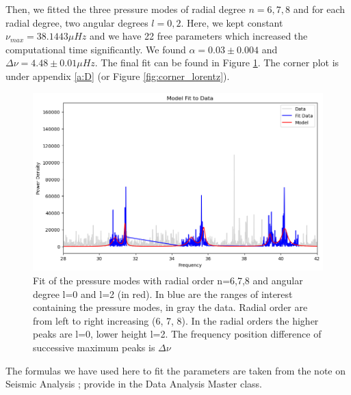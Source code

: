 \documentclass[12pt]{article}
\begin{document}
Then, we fitted the three pressure modes of radial degree $n=6,7,8$ and for each radial degree, two angular degrees $l=0,2$. Here, we kept constant $\nu_{max} = 38.1443\mu Hz$ and we have 22 free parameters which increased the computational time significantly. We found $\alpha = 0.03\pm 0.004$ and $\Delta\nu = 4.48 \pm 0.01 \mu Hz$. The final fit can be found in Figure \ref{fig:fit_pressureMode3}. The corner plot is under appendix \ref{a:D} (or Figure \ref{fig:corner_lorentz}).


\begin{figure}[H]
  \centering
  \includegraphics[width=\linewidth]{mode3.png}
  \caption{Fit of the pressure modes with radial order n=6,7,8 and angular degree l=0 and l=2 (in red). In blue are the ranges of interest containing the pressure modes, in gray the data. Radial order are from left to right increasing (6, 7, 8). In the radial orders the higher peaks are l=0, lower height l=2. The frequency position difference of successive maximum peaks is $\Delta\nu$}
  \label{fig:fit_pressureMode3}
\end{figure}

The formulas we have used here to fit the parameters are taken from the note on Seismic Analysis \cite{Benoit}; provide in the Data Analysis Master class.
\printbibliography
\appendix
\renewcommand{\thesection}{\Alph{section}}
\end{document}

